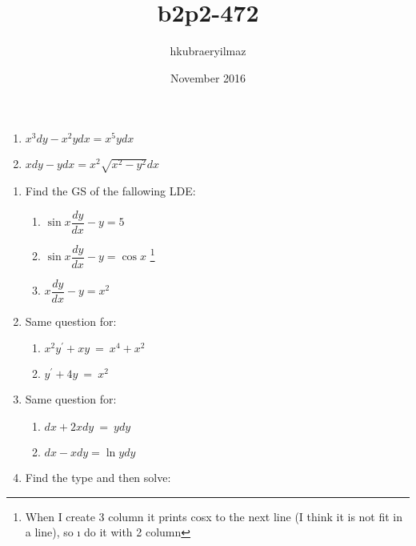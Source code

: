 \documentclass[11pt]{article}
\title{b2p2-472}
\author{hkubraeryilmaz }
\date{November 2016}
\begin{document}
\begin{multicols}{2}
    \begin{enumerate}[label=\alph*)]
        \item $x^3dy-x^2ydx=x^5ydx$  
        \item $xdy-ydx = x^2 \sqrt{x^2-y^2}dx$
    \end{enumerate}
\end{multicols}

   
\begin{enumerate}
     \item Find the GS of the fallowing LDE:
        \begin{multicols}{2}
            \begin{enumerate}[label=\alph*)]
                \item $\sin x\dfrac{dy}{dx} -y=5$
                \item $\sin x\dfrac{dy}{dx}-y= \cos x$ 
                \footnote{When I create 3 column it prints cosx to the next line (I think it is not fit in a line), so ı do it with 2 column}
                \item $ x \dfrac{dy}{dx}-y = x^2$
            \end{enumerate}
        \end{multicols}
    \item Same question for:
        \begin{multicols}{2}
            \begin{enumerate}[label=\alph*)]
                \item $x^2y^\prime + xy \ = \ x^4 + x^2$
                \item $y^\prime + 4y \ = \ x^2$
            \end{enumerate}
        \end{multicols}
    \item Same question for:
        \begin{multicols}{2}
            \begin{enumerate}[label=\alph*)]
                \item $dx + 2xdy \ = \ ydy$ 
                \item $dx - xdy = \ln ydy $ 
            \end{enumerate}
        \end{multicols}
    \item Find the type and then solve:
        \begin{multicols}{2}
            \begin{enumerate}[label=\alph*)]

\end{enumerate}
\end{multicols}
\end{enumerate}
\end{document}
